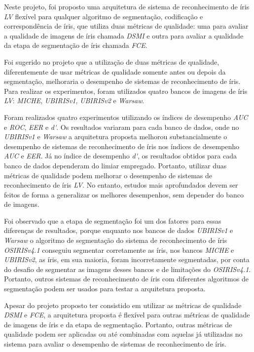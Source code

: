 
\par Neste projeto, foi proposto uma arquitetura de sistema de reconhecimento de íris \textit{\acrshort{LV}} flexível para qualquer algoritmo de segmentação, codificação e correspondência de íris, que utiliza duas métricas de qualidade: uma para avaliar a qualidade de imagens de íris chamada \textit{\acrshort{DSMI}} e outra para avaliar a qualidade da etapa de segmentação de íris chamada \textit{\acrshort{FCE}}. 

\par Foi sugerido no projeto que a utilização de duas métricas de qualidade, diferentemente de usar métricas de qualidade somente antes ou depois da segmentação, melhoraria o desempenho de sistemas de reconhecimento de íris. Para realizar os experimentos, foram utilizados quatro bancos de imagens de íris \textit{\acrshort{LV}}: \textit{MICHE}, \textit{UBIRISv1}, \textit{UBIRISv2} e \textit{\acrfull{Warsaw}}. 

\par Foram realizados quatro experimentos utilizando os índices de desempenho \textit{\acrshort{AUC}} e \textit{\acrshort{ROC}}, \textit{\acrshort{EER}} e \textit{\acrshort{d'}}. Os resultados variaram para cada banco de dados, onde no \textit{UBIRISv1} e \textit{\acrshort{Warsaw}} a arquitetura proposta melhorou substancialmente o desempenho de sistemas de reconhecimento de íris nos índices de desempenho \textit{\acrshort{AUC}} e \textit{\acrshort{EER}}. Já no índice de desempenho \textit{\acrshort{d'}}, os resultados obtidos para cada banco de dados dependeram do limiar empregado. Portanto, utilizar duas métricas de qualidade podem melhorar o desempenho de sistemas de reconhecimento de íris \textit{\acrshort{LV}}. No entanto, estudos mais aprofundados devem ser feitos de forma a generalizar os melhores desempenhos, sem depender do banco de imagens.

\par Foi observado que a etapa de segmentação foi um dos fatores para essas diferenças de resultados, porque enquanto nos bancos de dados \textit{UBIRISv1} e \textit{\acrshort{Warsaw}} o algoritmo de segmentação do sistema de reconhecimento de íris \textit{OSIRISv4.1} conseguiu segmentar corretamente as íris, nos bancos \textit{MICHE} e \textit{UBIRISv2}, as íris, em sua maioria, foram incorretamente segmentadas, por conta do desafio de segmentar as imagens desses bancos e de limitações do \textit{OSIRISv4.1}. Portanto, outros sistemas de reconhecimento de íris com diferentes algoritmos de segmentação podem ser usados para testar a arquitetura proposta.

\par Apesar do projeto proposto ter consistido em utilizar as métricas de qualidade \textit{\acrshort{DSMI}} e \textit{\acrshort{FCE}}, a arquitetura proposta é flexível para outras métricas de qualidade de imagens de íris e da etapa de segmentação. Portanto, outras métricas de qualidade podem ser aplicadas ou até combinadas com aquelas já utilizadas no sistema para avaliar o desempenho de sistemas de reconhecimento de íris.